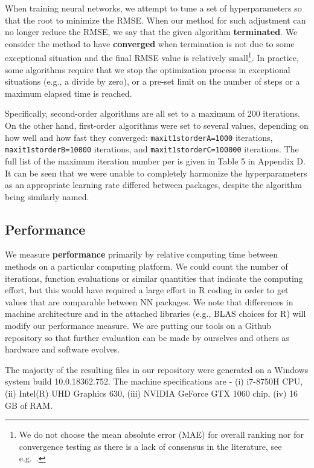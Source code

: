 When training neural networks, we attempt to tune a set of
hyperparameters so that the root to minimize the RMSE. When our method
for such adjustment can no longer reduce the RMSE, we say that the given
algorithm \textbf{terminated}. We consider the method to have
\textbf{converged} when termination is not due to some exceptional
situation and the final RMSE value is relatively small\footnote{We do
  not choose the mean absolute error (MAE) for overall ranking nor for
  convergence testing as there is a lack of consensus in the literature,
  see e.g.~\citep{willmott2005advantages,chai2014root}.}. In practice,
some algorithms require that we stop the optimization process in
exceptional situations (e.g., a divide by zero), or a pre-set limit on
the number of steps or a maximum elapsed time is reached.

Specifically, second-order algorithms are all set to a maximum of 200
iterations. On the other hand, first-order algorithms were set to
several values, depending on how well and how fast they converged:
\texttt{maxit1storderA=1000} iterations, \texttt{maxit1storderB=10000}
iterations, and \texttt{maxit1storderC=100000} iterations. The full list
of the maximum iteration number per  is given in
Table 5 in Appendix D. It can be seen that we were unable to completely
harmonize the hyperparameters as an appropriate learning rate differed
between packages, despite the algorithm being similarly named.

\hypertarget{performance}{%
\subsection{Performance}\label{performance}}

We measure \textbf{performance} primarily by relative computing time
between methods on a particular computing platform. We could count the
number of iterations, function evaluations or similar quantities that
indicate the computing effort, but this would have required a large
effort in R coding in order to get values that are comparable between NN
packages. We note that differences in machine architecture and in the
attached libraries (e.g., BLAS choices for \textsf{R}) will modify our
performance measure. We are putting our tools on a Github repository so
that further evaluation can be made by ourselves and others as hardware
and software evolves.

The majority of the resulting files in our repository were generated on
a Windows system build 10.0.18362.752. The machine specifications are -
(i) i7-8750H CPU, (ii) Intel(R) UHD Graphics 630, (iii) NVIDIA GeForce
GTX 1060 chip, (iv) 16 GB of RAM.

